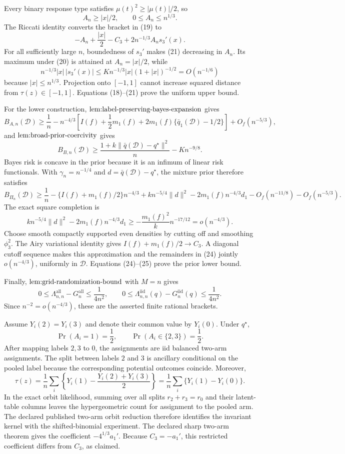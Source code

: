 Every binary response type satisfies \(\mu(t)^2\geq|\mu(t)|/2\), so
\[
A_n\geq |x|/2,
\qquad 0\leq A_n\leq n^{1/3}.
\tag{20}
\]
The Riccati identity converts the bracket in (19) to
\[
-A_n+\frac{|x|}{2}-C_3+2n^{-1/3}A_ns_3'(x).
\tag{21}
\]
For all sufficiently large \(n\), boundedness of \(s_3'\) makes (21) decreasing in \(A_n\).  Its maximum under (20) is attained at \(A_n=|x|/2\), while
\[
n^{-1/3}|x|\,|s_3'(x)|
\leq K n^{-1/3}|x|(1+|x|)^{-1/2}=O(n^{-1/6})
\]
because \(|x|\leq n^{1/3}\).  Projection onto \([-1,1]\) cannot increase squared distance from \(\tau(z)\in[-1,1]\).  Equations (18)--(21) prove the uniform upper bound.

For the lower construction, \(\textnormal{lem:label-preserving-bayes-expansion}\) gives
\[
B_{A,n}(\mathcal D)\geq
\frac1n-n^{-4/3}
\left[I(f)+\frac12m_1(f)+2m_1(f)
\{\bar q_1(\mathcal D)-1/2\}\right]+O_f(n^{-5/3}),
\tag{22}
\]
and \(\textnormal{lem:broad-prior-coercivity}\) gives
\[
B_{B,n}(\mathcal D)\geq
\frac{1+k\|\bar q(\mathcal D)-q^\star\|^2}{n}-Kn^{-9/8}.
\tag{23}
\]
Bayes risk is concave in the prior because it is an infimum of linear risk functionals.  With \(\gamma_n=n^{-1/4}\) and \(d=\bar q(\mathcal D)-q^\star\), the mixture prior therefore satisfies
\[
B_{\Pi_n}(\mathcal D)\geq
\frac1n-\{I(f)+m_1(f)/2\}n^{-4/3}
+k n^{-5/4}\|d\|^2
-2m_1(f)n^{-4/3}d_1
-O_f(n^{-11/8})-O_f(n^{-5/3}).
\tag{24}
\]
The exact square completion is
\[
k n^{-5/4}\|d\|^2-2m_1(f)n^{-4/3}d_1
\geq-\frac{m_1(f)^2}{k}n^{-17/12}
=o(n^{-4/3}).
\tag{25}
\]
Choose smooth compactly supported even densities by cutting off and smoothing \(\phi_3^2\).  The Airy variational identity gives \(I(f)+m_1(f)/2\to C_3\).  A diagonal cutoff sequence makes this approximation and the remainders in (24) jointly \(o(n^{-4/3})\), uniformly in \(\mathcal D\).  Equations (24)--(25) prove the prior lower bound.

Finally, \(\textnormal{lem:grid-randomization-bound}\) with \(M=n\) gives
\[
0\leq\Lambda_{n,n}^{\mathrm{all}}-G_n^{\mathrm{all}}\leq\frac1{4n^2},
\qquad
0\leq\Lambda_{n,n}^{\mathrm{iid}}(q)-G_n^{\mathrm{iid}}(q)\leq\frac1{4n^2}.
\]
Since \(n^{-2}=o(n^{-4/3})\), these are the asserted finite rational brackets.

Assume \(Y_i(2)=Y_i(3)\) and denote their common value by \(Y_i(0)\).  Under \(q^\star\),
\[
\Pr(A_i=1)=\frac12,
\qquad
\Pr(A_i\in\{2,3\})=\frac12.
\]
After mapping labels \(2,3\) to \(0\), the assignments are iid balanced two-arm assignments.  The split between labels \(2\) and \(3\) is ancillary conditional on the pooled label because the corresponding potential outcomes coincide.  Moreover,
\[
\tau(z)=\frac1n\sum_i\left\{Y_i(1)-\frac{Y_i(2)+Y_i(3)}2\right\}
=\frac1n\sum_i\{Y_i(1)-Y_i(0)\}.
\]
In the exact orbit likelihood, summing over all splits \(r_2+r_3=r_0\) and their latent-table columns leaves the hypergeometric count for assignment to the pooled arm.  The declared published two-arm orbit reduction therefore identifies the invariant kernel with the shifted-binomial experiment.  The declared sharp two-arm theorem gives the coefficient \(-4^{1/3}a_1'\).  Because \(C_3=-a_1'\), this restricted coefficient differs from \(C_3\), as claimed.

